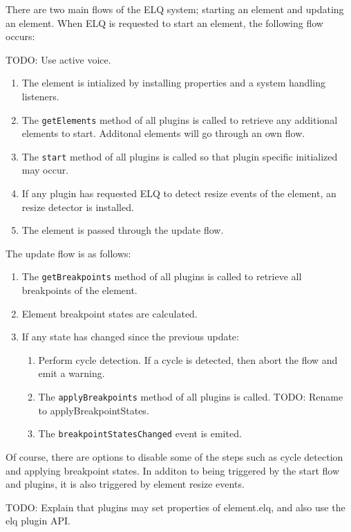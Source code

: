 \documentclass{acm_proc_article-sp}
\newcommand{\code}[1]{\texttt{#1}}
\newcommand{\elq}{ELQ}
\begin{document}
  There are two main flows of the \elq{} system; starting an element and updating an element.
  When \elq{} is requested to start an element, the following flow occurs:

  TODO: Use active voice.

  \begin{enumerate}
    \item The element is intialized by installing properties and a system handling listeners.
    \item 
          The \code{getElements} method of all plugins is called to retrieve any additional elements to start.
          Additonal elements will go through an own flow.
    \item The \code{start} method of all plugins is called so that plugin specific initialized may occur.
    \item If any plugin has requested \elq{} to detect resize events of the element, an resize detector is installed.
    \item The element is passed through the update flow.
  \end{enumerate}


  The update flow is as follows:
  \begin{enumerate}
    \item The \code{getBreakpoints} method of all plugins is called to retrieve all breakpoints of the element.
    \item Element breakpoint states are calculated.
    \item If any state has changed since the previous update:
    \begin{enumerate}
      \item Perform cycle detection. If a cycle is detected, then abort the flow and emit a warning.
      \item The \code{applyBreakpoints} method of all plugins is called. TODO: Rename to applyBreakpointStates.
      \item The \code{breakpointStatesChanged} event is emited.
    \end{enumerate}
  \end{enumerate}

  Of course, there are options to disable some of the steps such as cycle detection and applying breakpoint states.
  In additon to being triggered by the start flow and plugins, it is also triggered by element resize events.

  TODO: Explain that plugins may set properties of element.elq, and also use the elq plugin API.
\end{document}
